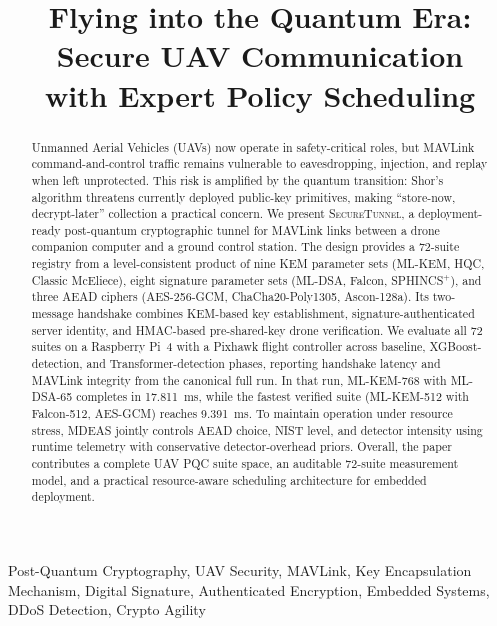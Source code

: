 \documentclass[conference]{IEEEtran}
\newcommand{\sys}{\textsc{SecureTunnel}}
\begin{document}
\title{Flying into the Quantum Era: Secure UAV Communication\\with Expert Policy Scheduling}

\author{
}

\maketitle

\begin{abstract}
Unmanned Aerial Vehicles (UAVs) now operate in safety-critical roles, but MAVLink command-and-control traffic remains vulnerable to eavesdropping, injection, and replay when left unprotected.
This risk is amplified by the quantum transition: Shor's algorithm threatens currently deployed public-key primitives, making ``store-now, decrypt-later'' collection a practical concern.
We present \sys{}, a deployment-ready post-quantum cryptographic tunnel for MAVLink links between a drone companion computer and a ground control station.
The design provides a 72-suite registry from a level-consistent product of nine KEM parameter sets (ML-KEM, HQC, Classic McEliece), eight signature parameter sets (ML-DSA, Falcon, SPHINCS$^+$), and three AEAD ciphers (AES-256-GCM, ChaCha20-Poly1305, Ascon-128a).
Its two-message handshake combines KEM-based key establishment, signature-authenticated server identity, and HMAC-based pre-shared-key drone verification.
We evaluate all 72 suites on a Raspberry Pi~4 with a Pixhawk flight controller across baseline, XGBoost-detection, and Transformer-detection phases, reporting handshake latency and MAVLink integrity from the canonical full run.
In that run, ML-KEM-768 with ML-DSA-65 completes in \SI{17.811}{\milli\second}, while the fastest verified suite (ML-KEM-512 with Falcon-512, AES-GCM) reaches \SI{9.391}{\milli\second}.
To maintain operation under resource stress, MDEAS jointly controls AEAD choice, NIST level, and detector intensity using runtime telemetry with conservative detector-overhead priors.
Overall, the paper contributes a complete UAV PQC suite space, an auditable 72-suite measurement model, and a practical resource-aware scheduling architecture for embedded deployment.
\end{abstract}

\begin{IEEEkeywords}
Post-Quantum Cryptography, UAV Security, MAVLink, Key Encapsulation Mechanism, Digital Signature, Authenticated Encryption, Embedded Systems, DDoS Detection, Crypto Agility
\end{IEEEkeywords}
\end{document}
